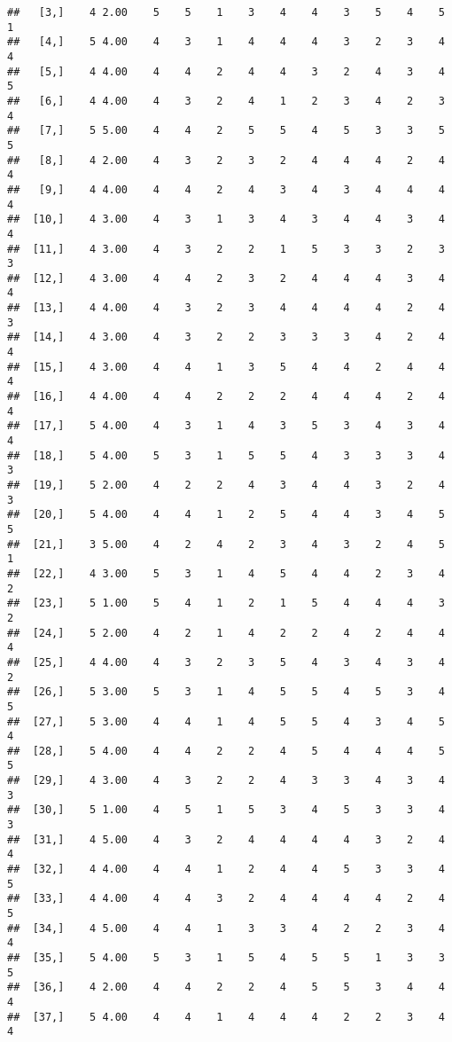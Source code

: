 \documentclass[]{article}
\begin{document}
\begin{verbatim}
##   [3,]    4 2.00    5    5    1    3    4    4    3    5    4    5    1
##   [4,]    5 4.00    4    3    1    4    4    4    3    2    3    4    4
##   [5,]    4 4.00    4    4    2    4    4    3    2    4    3    4    5
##   [6,]    4 4.00    4    3    2    4    1    2    3    4    2    3    4
##   [7,]    5 5.00    4    4    2    5    5    4    5    3    3    5    5
##   [8,]    4 2.00    4    3    2    3    2    4    4    4    2    4    4
##   [9,]    4 4.00    4    4    2    4    3    4    3    4    4    4    4
##  [10,]    4 3.00    4    3    1    3    4    3    4    4    3    4    4
##  [11,]    4 3.00    4    3    2    2    1    5    3    3    2    3    3
##  [12,]    4 3.00    4    4    2    3    2    4    4    4    3    4    4
##  [13,]    4 4.00    4    3    2    3    4    4    4    4    2    4    3
##  [14,]    4 3.00    4    3    2    2    3    3    3    4    2    4    4
##  [15,]    4 3.00    4    4    1    3    5    4    4    2    4    4    4
##  [16,]    4 4.00    4    4    2    2    2    4    4    4    2    4    4
##  [17,]    5 4.00    4    3    1    4    3    5    3    4    3    4    4
##  [18,]    5 4.00    5    3    1    5    5    4    3    3    3    4    3
##  [19,]    5 2.00    4    2    2    4    3    4    4    3    2    4    3
##  [20,]    5 4.00    4    4    1    2    5    4    4    3    4    5    5
##  [21,]    3 5.00    4    2    4    2    3    4    3    2    4    5    1
##  [22,]    4 3.00    5    3    1    4    5    4    4    2    3    4    2
##  [23,]    5 1.00    5    4    1    2    1    5    4    4    4    3    2
##  [24,]    5 2.00    4    2    1    4    2    2    4    2    4    4    4
##  [25,]    4 4.00    4    3    2    3    5    4    3    4    3    4    2
##  [26,]    5 3.00    5    3    1    4    5    5    4    5    3    4    5
##  [27,]    5 3.00    4    4    1    4    5    5    4    3    4    5    4
##  [28,]    5 4.00    4    4    2    2    4    5    4    4    4    5    5
##  [29,]    4 3.00    4    3    2    2    4    3    3    4    3    4    3
##  [30,]    5 1.00    4    5    1    5    3    4    5    3    3    4    3
##  [31,]    4 5.00    4    3    2    4    4    4    4    3    2    4    4
##  [32,]    4 4.00    4    4    1    2    4    4    5    3    3    4    5
##  [33,]    4 4.00    4    4    3    2    4    4    4    4    2    4    5
##  [34,]    4 5.00    4    4    1    3    3    4    2    2    3    4    4
##  [35,]    5 4.00    5    3    1    5    4    5    5    1    3    3    5
##  [36,]    4 2.00    4    4    2    2    4    5    5    3    4    4    4
##  [37,]    5 4.00    4    4    1    4    4    4    2    2    3    4    4

\end{verbatim}
\end{document}
